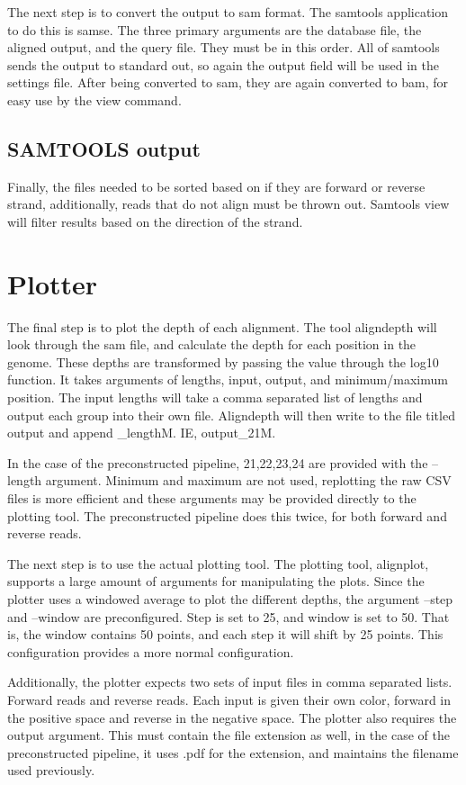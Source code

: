 \documentclass[10pt,a4paper]{article}
\begin{document}
The next step is to convert the output to sam format. The samtools application to do this is samse. The three primary arguments are the database file, the aligned output, and the query file. They must be in this order. All of samtools sends the output to standard out, so again the output field will be used in the settings file. After being converted to sam, they are again converted to bam, for easy use by the view command.

\subsection{SAMTOOLS output}

Finally, the files needed to be sorted based on if they are forward or reverse strand, additionally, reads that do not align must be thrown out. Samtools view will filter results based on the direction of the strand. 

\section{Plotter}

The final step is to plot the depth of each alignment. The tool aligndepth will look through the sam file, and calculate the depth for each position in the genome. These depths are transformed by passing the value through the log10 function. It takes arguments of lengths, input, output, and minimum/maximum position. The input lengths will take a comma separated list of lengths and output each group into their own file.  Aligndepth will then write to the file titled output and append \_lengthM. IE, output\_21M.

In the case of the preconstructed pipeline, 21,22,23,24 are provided with the --length argument. Minimum and maximum are not used, replotting the raw CSV files is more efficient and these arguments may be provided directly to the plotting tool. The preconstructed pipeline does this twice, for both forward and reverse reads. 

The next step is to use the actual plotting tool. The plotting tool, alignplot, supports a large amount of arguments for manipulating the plots. Since the plotter uses a windowed average to plot the different depths, the argument --step and --window are preconfigured. Step is set to 25, and window is set to 50. That is, the window contains 50 points, and each step it will shift by 25 points. This configuration provides a more normal configuration. 

Additionally, the plotter expects two sets of input files in comma separated lists. Forward reads and reverse reads. Each input is given their own color, forward in the positive space and reverse in the negative space. The plotter also requires the output argument. This must contain the file extension as well, in the case of the preconstructed pipeline, it uses .pdf for the extension, and maintains the filename used previously.
\end{document}
